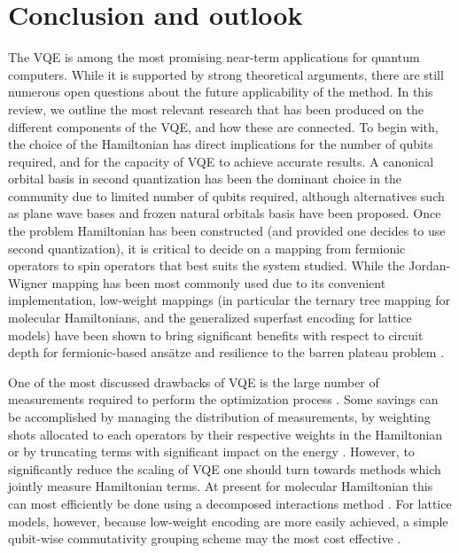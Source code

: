 \documentclass[a4paper,fleqn]{cas-sc}
\begin{document}








\section{Conclusion and outlook}

The VQE is among the most promising near-term applications for quantum computers. While it is supported by strong theoretical arguments, there are still numerous open questions about the future applicability of the method. In this review, we outline the most relevant research that has been produced on the different components of the VQE, and how these are connected. To begin with, the choice of the Hamiltonian has direct implications for the number of qubits required, and for the capacity of VQE to achieve accurate results. A canonical orbital basis in second quantization has been the dominant choice in the community due to limited number of qubits required, although alternatives such as plane wave bases \cite{Babbush2018, Barkoutsos2018} and frozen natural orbitals basis \cite{Gonthier2020} have been proposed. Once the problem Hamiltonian has been constructed (and provided one decides to use second quantization), it is critical to decide on a mapping from fermionic operators to spin operators that best suits the system studied. While the Jordan-Wigner mapping \cite{Jordan1928} has been most commonly used due to its convenient implementation, low-weight mappings (in particular the ternary tree mapping \cite{Jiang2020} for molecular Hamiltonians, and the generalized superfast encoding \cite{Setia2019} for lattice models) have been shown to bring significant benefits with respect to circuit depth \cite{Tranter2015} for fermionic-based ans\"atze and resilience to the barren plateau problem \cite{Cerezo2021_BP, Uvarov2020, Uvarov2020_frustrated}. 

One of the most discussed drawbacks of VQE is the large number of measurements required to perform the optimization process \cite{Wecker2015, Elfving2020, Gonthier2020}. Some savings can be accomplished by managing the distribution of measurements, by weighting shots allocated to each operators by their respective weights in the Hamiltonian \cite{Wecker2015, Rubin2018, Arrasmith2020} or by truncating terms with significant impact on the energy \cite{mccleanTheoryVariationalHybrid2015}. However, to significantly reduce the scaling of VQE one should turn towards methods which jointly measure Hamiltonian terms. At present for molecular Hamiltonian this can most efficiently be done using a decomposed interactions method \cite{Huggins2021, Yen2021_Cartan}. For lattice models, however, because low-weight encoding are more easily achieved, a simple qubit-wise commutativity grouping scheme may the most cost effective \cite{mccleanTheoryVariationalHybrid2015, Kandala2017, Hempel2018, Rubin2018, Kokail2019, Izmaylov2019, Nam2020, Verteletskyi2020, Hamamura2020, Gokhale2019_long}. 
\end{document}
